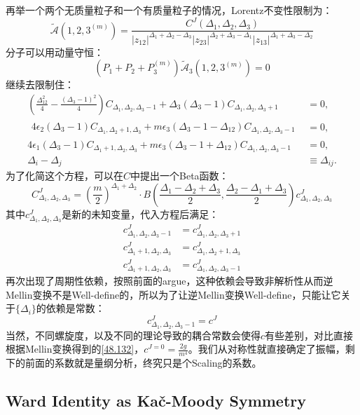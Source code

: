再举一个两个无质量粒子和一个有质量粒子的情况，Lorentz不变性限制为：
\begin{equation}
	\widetilde{\mathcal{A}}(1,2,3^{(m)})=\frac{C^J(\Delta_1,\Delta_2,\Delta_3)}{|z_{12}|^{\Delta_1+\Delta_2-\Delta_3}|z_{23}|^{\Delta_2+\Delta_3-\Delta_1}|z_{13}|^{\Delta_1+\Delta_3-\Delta_2}}
\end{equation}
分子可以用动量守恒：
\begin{equation}
	\left(P_1+P_2+P_3^{(m)}\right)\widetilde{\mathcal{A}}_3(1,2,3^{(m)})=0
\end{equation}
继续去限制住：
\begin{equation}
	\begin{aligned}
		\left(\frac{\Delta_{12}^2}4-\frac{(\Delta_3-1)^2}4\right)C_{\Delta_1,\Delta_2,\Delta_3-1}+\Delta_3(\Delta_3-1)C_{\Delta_1,\Delta_2,\Delta_3+1}& =0,  \\
		\begin{aligned}4\epsilon_2(\Delta_3-1)C_{\Delta_1,\Delta_2+1,\Delta_3}+m\epsilon_3(\Delta_3-1-\Delta_{12})C_{\Delta_1,\Delta_2,\Delta_3-1}\end{aligned}& =0,  \\
		4\epsilon_1(\Delta_3-1)C_{\Delta_1+1,\Delta_2,\Delta_3}+m\epsilon_3(\Delta_3-1+\Delta_{12})C_{\Delta_1,\Delta_2,\Delta_3-1}& =0, \\
		\Delta_i-\Delta_j&\equiv \Delta_{ij}.
	\end{aligned}
\end{equation}
为了化简这个方程，可以在$C$中提出一个Beta函数：
\begin{equation}
	C_{\Delta_1,\Delta_2,\Delta_3}^J=\left(\frac m2\right)^{\Delta_1+\Delta_2}\cdot B\left(\frac{\Delta_1-\Delta_2+\Delta_3}2,\frac{\Delta_2-\Delta_1+\Delta_3}2\right)c^J_{\Delta_1,\Delta_2,\Delta_3}
\end{equation}
其中$c^J_{\Delta_1,\Delta_2,\Delta_3}$是新的未知变量，代入方程后满足：
\begin{equation}
	\begin{aligned}c^J_{\Delta_1,\Delta_2,\Delta_3-1}&=c^J_{\Delta_1,\Delta_2,\Delta_3+1}\\c^J_{\Delta_1+1,\Delta_2,\Delta_3}&=c^J_{\Delta_1,\Delta_2+1,\Delta_3}\\c^J_{\Delta_1+1,\Delta_2,\Delta_3}&=c^J_{\Delta_1,\Delta_2,\Delta_3-1}\end{aligned}
\end{equation}
再次出现了周期性依赖，按照前面的argue，这种依赖会导致非解析性从而逆Mellin变换不是Well-define的，所以为了让逆Mellin变换Well-define，只能让它关于$\{\Delta_i\}$的依赖是常数：
\begin{equation}
	c^J_{\Delta_1,\Delta_2,\Delta_3-1}=c^J
\end{equation}
当然，不同螺旋度，以及不同的理论导致的耦合常数会使得$c$有些差别，对比直接根据Mellin变换得到的\ref{48.132}，$c^{J=0}=\frac{2g}{m^4}$。我们从对称性就直接确定了振幅，剩下的前面的系数就是量纲分析，终究只是个Scaling的系数。
\subsection{Ward Identity as Ka\v{c}-Moody Symmetry}
